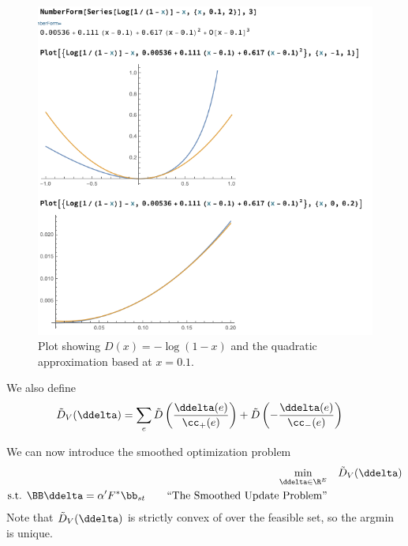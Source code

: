 \begin{figure}[H]
  \centering
    \includegraphics[width=\textwidth]{fig/quad-div-apx.png} %
    \caption{Plot showing ${D(x) = -\log(1-x)}$ and the quadratic
      approximation based at $x = 0.1$.}
\end{figure}


We also define
  \begin{align*}
  \sdiv_V( \ddelta )
 &=
    \sum_e
     \sdiv\left(\frac{\ddelta(e)}{\cc_+(e)}\right)
    +
     \sdiv\left(-\frac{\ddelta(e)}{\cc_-(e)}\right)
  \end{align*}

We can now introduce the smoothed optimization problem
\begin{align}
   \label{eq:sdivflow}
  \min_{\ddelta \in \R^E} & \quad 
     \sdiv_V( \ddelta )
  \\
  \textrm{s.t. }  \BB\ddelta = \alpha' F^* \bb_{st}
\tag*{``The Smoothed Update Problem''}
\end{align}
Note that  $\sdiv_V( \ddelta )$ is strictly convex of over the
feasible set, so the argmin is unique.

